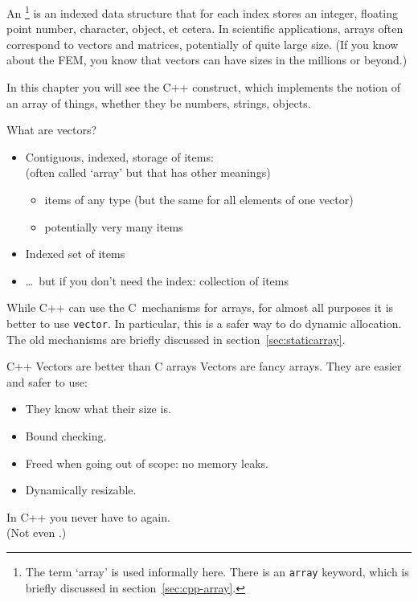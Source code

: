 
An \footnote
{The term `array' is used informally here.
  There is an \texttt{array} keyword,
  which is briefly discussed in section~\ref{sec:cpp-array}.}
is an indexed data structure that for each
index stores an integer, floating point number, character,
object, et cetera.
In scientific applications, arrays often correspond to vectors and
matrices, potentially of quite large size. (If you know about the
\acf{FEM}, you know that vectors can have sizes in the millions or beyond.)

In this chapter you will see the C++  construct,
which implements the notion of an array of things, whether they be
numbers, strings, objects.

\begin{slide}{What are vectors?}
  \label{sl:what-vector}
  \begin{itemize}
  \item Contiguous, indexed, storage of items:\\
    (often called `array' but that has other meanings)
    \begin{itemize}
    \item items of any type (but the same for all elements of one
      vector)
    \item potentially very many items
    \end{itemize}
  \item Indexed set of items
  \item \ldots~but if you don't need the index: collection of items
  \end{itemize}
\end{slide}

\begin{cnote}
  While C++ can use the C~mechanisms for arrays, for almost all purposes
  it is better to use \lstinline{vector}. In particular, this is a safer way to
  do dynamic allocation. The old
  mechanisms are briefly discussed in section~\ref{sec:staticarray}.
\end{cnote}

\begin{slide}{C++ Vectors are better than C arrays}
  \label{sl:vector-why}
  Vectors are fancy arrays. They are easier and safer to use:
  \begin{itemize}
  \item They know what their size is.
  \item Bound checking.
  \item Freed when going out of scope: no memory leaks.
  \item Dynamically resizable.
  \end{itemize}
  In C++ you never have to  again.\\
  (Not even .)
\end{slide}


